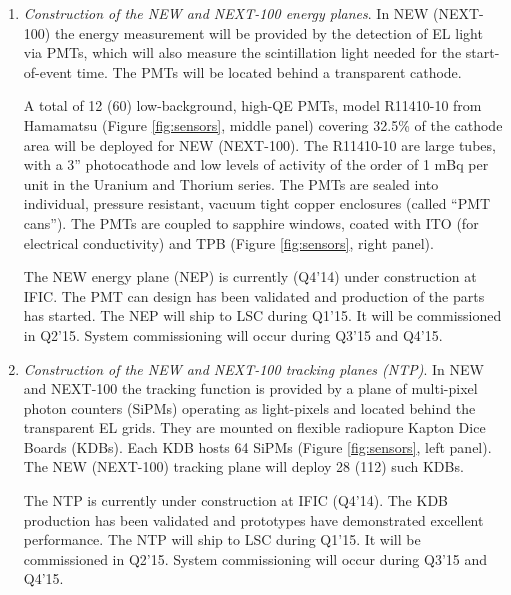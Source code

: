 \begin{enumerate}
\item {\em Construction of the NEW and NEXT-100 energy planes}.
In NEW (NEXT-100) the energy measurement will be provided by the detection of EL light via PMTs, which will also measure the scintillation light needed for the start-of-event time. The PMTs will be located behind a transparent cathode.

A total of 12 (60) low-background, high-QE PMTs, model R11410-10 from Hamamatsu (Figure  \ref{fig:sensors}, middle panel) covering 32.5\% of the cathode area will be deployed for NEW (NEXT-100). The R11410-10 are large tubes, with a 3'' photocathode and low levels of  activity of the order of 1 mBq per unit in the Uranium and Thorium series. The PMTs are sealed into individual, pressure resistant, vacuum tight copper enclosures (called ``PMT cans''). The PMTs are coupled to 
sapphire windows, coated with ITO (for electrical conductivity) and TPB (Figure  \ref{fig:sensors}, right panel).

The NEW energy plane (NEP) is currently (Q4'14) under construction at IFIC. The PMT can design has been validated and production of the parts has started. The NEP will ship to LSC during Q1'15. It will be commissioned in Q2'15. System commissioning will occur during Q3'15 and Q4'15.

\item  {\em Construction of the NEW and NEXT-100 tracking planes (NTP)}.
In NEW and NEXT-100 the tracking function is provided by a plane of multi-pixel photon counters (SiPMs) operating as light-pixels and located behind the transparent EL grids. They are mounted on flexible radiopure Kapton Dice Boards (KDBs). Each KDB hosts 64 SiPMs (Figure  \ref{fig:sensors}, left panel). The NEW (NEXT-100) tracking plane will deploy 28 (112) such KDBs. 

The NTP is currently under construction at IFIC (Q4'14). The KDB production has been validated and prototypes have demonstrated excellent performance. The NTP will ship to LSC during Q1'15. It will be commissioned in Q2'15. System commissioning will occur during Q3'15 and Q4'15. 

\end{enumerate}
 

